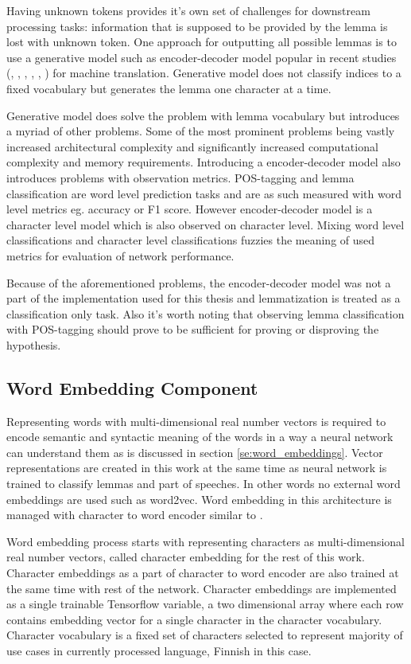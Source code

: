 \documentclass[12pt,a4paper,english
]{tutthesis}
\begin{document}
Having unknown tokens provides it's own set of challenges for downstream processing tasks: information that is supposed to be provided by the lemma is lost with unknown token. One approach for outputting all possible lemmas is to use a generative model such as encoder-decoder model popular in recent studies (\cite{Sutskever2014}, \cite{Cho2014}, \cite{Chung2016}, \cite{Bahdanau2014}, \cite{Liu2016a}, \cite{Chung2016}) for machine translation. Generative model does not classify indices to a fixed vocabulary but generates the lemma one character at a time.

Generative model does solve the problem with lemma vocabulary but introduces a myriad of other problems. Some of the most prominent problems being vastly increased architectural complexity and significantly increased computational complexity and memory requirements. Introducing a encoder-decoder model also introduces problems with observation metrics. POS-tagging and lemma classification are word level prediction tasks and are as such measured with word level metrics eg. accuracy or F1 score. However encoder-decoder model is a character level model which is also observed on character level. Mixing word level classifications and character level classifications fuzzies the meaning of used metrics for evaluation of network performance.

Because of the aforementioned problems, the encoder-decoder model was not a part of the implementation used for this thesis and lemmatization is treated as a classification only task. Also it's worth noting that observing lemma classification with POS-tagging should prove to be sufficient for proving or disproving the hypothesis. 

\subsection{Word Embedding Component}
\label{ss:word_embedding_component}
Representing words with multi-dimensional real number vectors is required to encode semantic and syntactic meaning of the words in a way a neural network can understand them as is discussed in section \ref{se:word_embeddings}. Vector representations are created in this work at the same time as neural network is trained to classify lemmas and part of speeches. In other words no external word embeddings are used such as word2vec. Word embedding in this architecture is managed with character to word encoder similar to \cite{Ling2015}.

Word embedding process starts with representing characters as multi-dimensional real number vectors, called character embedding for the rest of this work. Character embeddings as a part of character to word encoder are also trained at the same time with rest of the network. Character embeddings are implemented as a single trainable Tensorflow variable, a two dimensional array where each row contains embedding vector for a single character in the character vocabulary. Character vocabulary is a fixed set of characters selected to represent majority of use cases in currently processed language, Finnish in this case.
\end{document}
